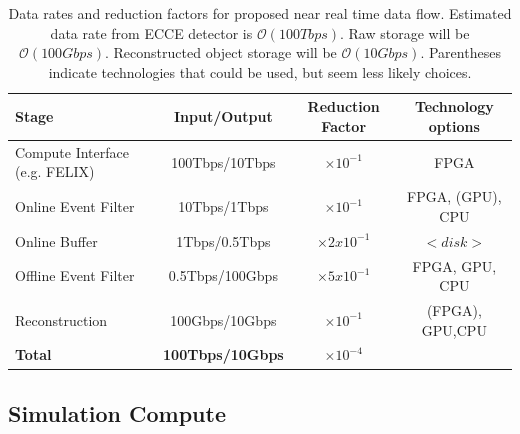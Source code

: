 \begin{table}[htb!]
    \centering
    \begin{tabular}{p{4cm}|c|c|c}
        \hline
        Stage                        & Input/Output    & Reduction Factor & Technology options \\
        \hline
        \hline
        Compute Interface (e.g. FELIX) & 100Tbps/10Tbps  & $\times 10^{-1}$ & FPGA \\
        \hline
        Online Event Filter          & 10Tbps/1Tbps    & $\times 10^{-1}$ & FPGA, (GPU), CPU\\
        \hline
        Online Buffer                & 1Tbps/0.5Tbps   & $\times 2x10^{-1}$  & $<disk>$ \\
        \hline
        Offline Event Filter         & 0.5Tbps/100Gbps & $\times 5x10^{-1}$  & FPGA, GPU, CPU \\
        \hline
        Reconstruction               & 100Gbps/10Gbps  & $\times 10^{-1}$ & (FPGA), GPU,CPU\\
        \hline
        \hline
        \textbf{Total}               & \textbf{100Tbps/10Gbps} & \textbf{$\times 10^{-4}$} & \\
        \hline
    \end{tabular}
    \caption{Data rates and reduction factors for proposed near real time data flow. Estimated data rate from ECCE detector is $\mathcal{O}(100Tbps)$. Raw storage will be $\mathcal{O}(100Gbps)$. Reconstructed object storage will be $\mathcal{O}(10Gbps)$. Parentheses indicate technologies that could be used, but seem less likely choices.}
    \label{tab:reduction_factors}
\end{table}

\subsection{Simulation Compute}

